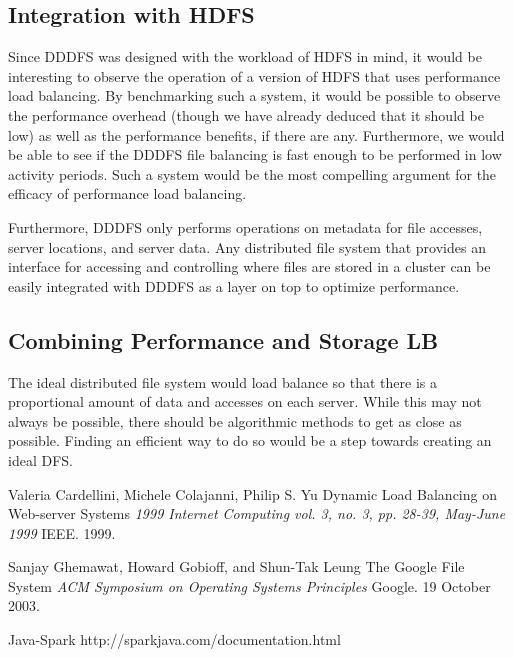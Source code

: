 \documentclass[twoside]{article}
\begin{document}
\begin{multicols}{2}
\subsection*{Integration with HDFS}
Since DDDFS was designed with the workload of HDFS in mind, it would be interesting to observe the operation of a version of HDFS that uses performance load balancing. By benchmarking such a system, it would be possible to observe the performance overhead (though we have already deduced that it should be low) as well as the performance benefits, if there are any. Furthermore, we would be able to see if the DDDFS file balancing is fast enough to be performed in low activity periods. Such a system would be the most compelling argument for the efficacy of performance load balancing.	

Furthermore, DDDFS only performs operations on metadata for file accesses, server locations, and server data. Any distributed file system that provides an interface for accessing and controlling where files are stored in a cluster can be easily integrated with DDDFS as a layer on top to optimize performance. 

\subsection*{Combining Performance and Storage LB}
The ideal distributed file system would load balance so that there is a proportional amount of data and accesses on each server. While this may not always be possible, there should be algorithmic methods to get as close as possible. Finding an efficient way to do so would be a step towards creating an ideal DFS. 

\begin{thebibliography}{99} %
 Valeria Cardellini, Michele Colajanni, Philip S. Yu
\newblock Dynamic Load Balancing on Web-server Systems
\newblock \textit{1999 Internet Computing vol. 3, no. 3, pp. 28-39, May-June 1999}
\newblock IEEE. 1999.

 Sanjay Ghemawat, Howard Gobioff, and Shun-Tak Leung
\newblock The Google File System
\newblock \textit{ACM Symposium on Operating Systems Principles}
\newblock Google. 19 October 2003.

 Java-Spark
\newblock http://sparkjava.com/documentation.html


\end{thebibliography}
\end{multicols}
\end{document}
